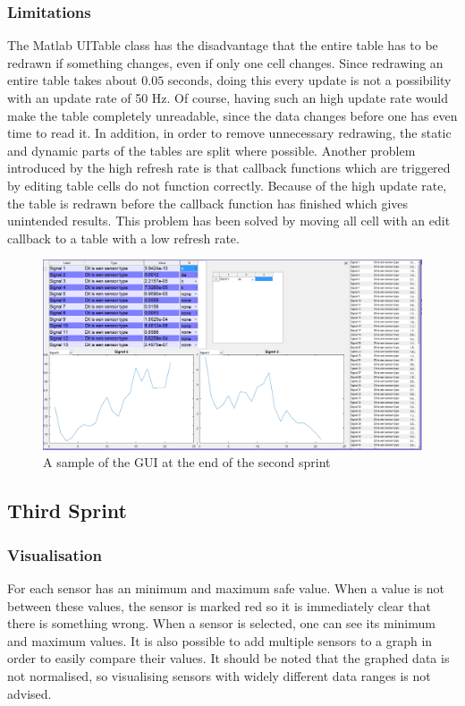 \subsubsection{Limitations}

The Matlab UITable class has the disadvantage that the entire table has to be redrawn if something changes, even if only one cell changes. Since redrawing an entire table takes about $0.05$ seconds, 
doing this every update is not a possibility with an update rate of 50 Hz. Of course, having such an high update rate would make the table completely unreadable, since the data changes before one has even time to read it. In addition, in order to remove unnecessary redrawing, the static and dynamic parts of the tables are split where possible. Another problem introduced by the high refresh rate is that callback functions which are triggered by editing table cells do not function correctly. Because of the high update rate, the table is redrawn before the callback function has finished which gives unintended results. This problem has been solved by moving all cell with an edit callback to a table with a low refresh rate. 

\begin{figure}[H]
	\centering
	\includegraphics[width=.75\textwidth]{images/GUIV1}
	\caption{A sample of the GUI at the end of the second sprint} 
	\label{fig:GUIV1}
\end{figure} 

\subsection{Third Sprint}

\subsubsection{Visualisation}
For each sensor has an minimum and maximum safe value. When a value is not between these values, the sensor is marked red so it is immediately clear that there is something wrong. When a sensor is selected, one can see its minimum and maximum values. It is also possible to add multiple sensors to a graph in order to easily compare their values. It should be noted that the graphed data is not normalised, so visualising sensors with widely different data ranges is not advised.  

